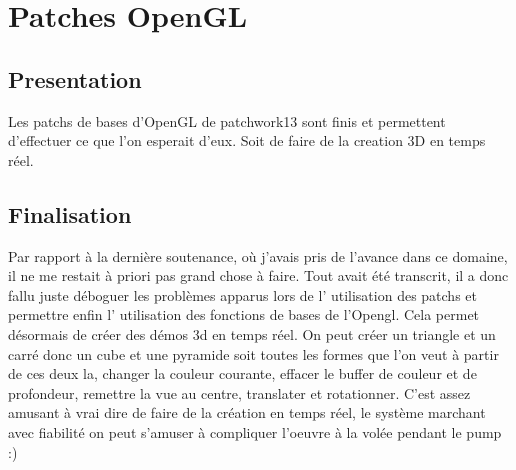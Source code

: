 \chapter{Patches OpenGL}


\section{Presentation}
Les patchs de bases d'OpenGL de patchwork13 sont finis et permettent 
d'effectuer ce que l'on esperait d'eux. Soit de faire  
de la creation 3D en temps r\'eel. 

\section{Finalisation}

Par rapport \`a la derni\`ere soutenance, o\`u j'avais pris de l'avance 
dans ce domaine, il ne me restait \`a priori 
pas grand chose \`a faire. Tout avait \'et\'e transcrit, il a donc fallu juste d\'eboguer
les probl\`emes apparus lors de l' utilisation des patchs
et permettre enfin 
l' utilisation des fonctions de bases de l'Opengl.
 Cela permet d\'esormais de cr\'eer des d\'emos 3d en temps r\'eel.
 On peut cr\'eer un triangle et un carr\'e donc un cube et une pyramide soit toutes les formes
 que l'on veut \`a partir de ces deux la, changer la couleur courante,
 effacer le buffer de couleur et de profondeur, remettre la vue au centre, 
translater et rotationner. C'est assez amusant \`a vrai dire 
de faire de la cr\'eation en temps r\'eel, le syst\`eme marchant 
avec fiabilit\'e on peut s'amuser \`a compliquer l'oeuvre \`a la vol\'ee pendant le pump :)  